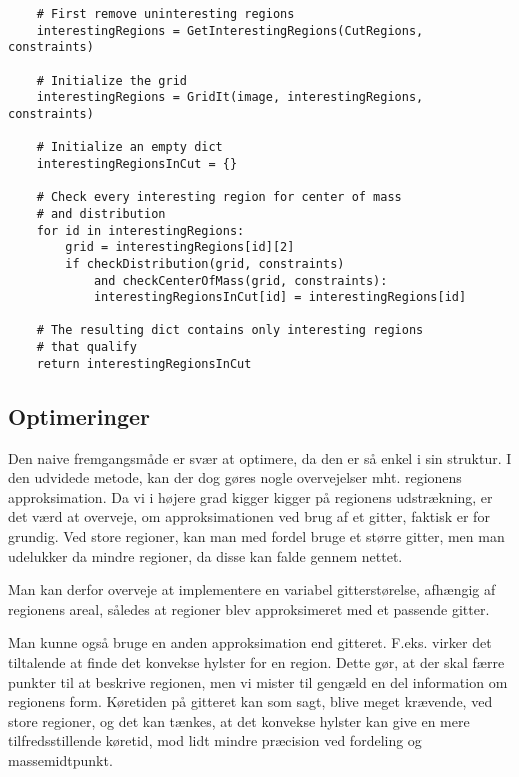 {\begin{lstlisting}
    # First remove uninteresting regions
    interestingRegions = GetInterestingRegions(CutRegions, constraints)

    # Initialize the grid
    interestingRegions = GridIt(image, interestingRegions, constraints)

    # Initialize an empty dict
    interestingRegionsInCut = {}

    # Check every interesting region for center of mass
    # and distribution
    for id in interestingRegions:
        grid = interestingRegions[id][2]
        if checkDistribution(grid, constraints)
            and checkCenterOfMass(grid, constraints):
            interestingRegionsInCut[id] = interestingRegions[id]

    # The resulting dict contains only interesting regions
    # that qualify
    return interestingRegionsInCut
\end{lstlisting}

\subsection{Optimeringer}
Den naive fremgangsmåde er svær at optimere, da den er så enkel i sin
struktur. I den udvidede metode, kan der dog gøres nogle overvejelser
mht. regionens approksimation. Da vi i højere grad kigger kigger på
regionens udstrækning, er det værd at overveje, om approksimationen ved
brug af et gitter, faktisk er for grundig. Ved store regioner, kan man
med fordel bruge et større gitter, men man udelukker da mindre regioner,
da disse kan falde gennem nettet.

Man kan derfor overveje at implementere en variabel gitterstørelse,
afhængig af regionens areal, således at regioner blev approksimeret med
et passende gitter.

Man kunne også bruge en anden approksimation end gitteret. F.eks. virker
det tiltalende at finde det konvekse hylster for en region. Dette
gør, at der skal færre punkter til at beskrive regionen, men vi mister
til gengæld en del information om regionens form. Køretiden på gitteret
kan som sagt, blive meget krævende, ved store regioner, og det kan
tænkes, at det konvekse hylster kan give en mere tilfredsstillende
køretid, mod lidt mindre præcision ved fordeling og massemidtpunkt.
\clearpage

}

